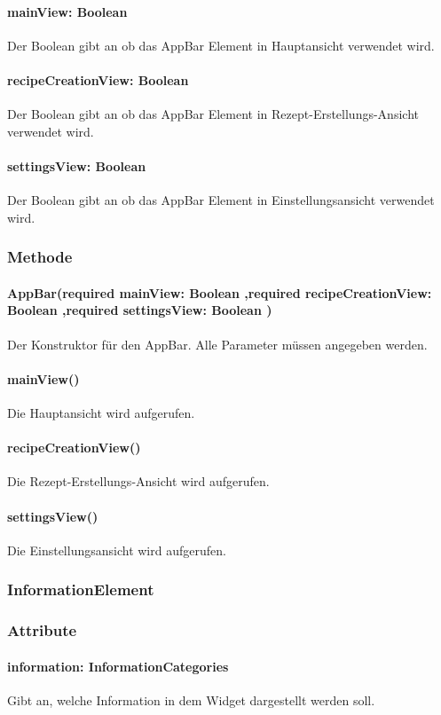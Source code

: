 \documentclass{entwurfsheft}
\begin{document}
\paragraph*{mainView: Boolean} Der Boolean gibt an ob das AppBar Element in Hauptansicht verwendet wird.
\paragraph*{recipeCreationView: Boolean} Der Boolean gibt an ob das AppBar Element in Rezept-Erstellungs-Ansicht verwendet wird.
\paragraph*{settingsView: Boolean} Der Boolean gibt an ob das AppBar Element in Einstellungsansicht verwendet wird.

\subsubsection*{Methode}
\paragraph*{AppBar(required mainView: Boolean ,required recipeCreationView: Boolean ,required settingsView: Boolean )} Der Konstruktor für den AppBar. Alle Parameter müssen angegeben werden.
\paragraph*{mainView()} Die Hauptansicht wird aufgerufen.
\paragraph*{recipeCreationView()} Die Rezept-Erstellungs-Ansicht wird aufgerufen.
\paragraph*{settingsView()} Die Einstellungsansicht wird aufgerufen.


\subsubsection{InformationElement}\label{sec:InformationElement}
\subsubsection*{Attribute}
\paragraph*{information: InformationCategories} Gibt an, welche Information in dem Widget dargestellt werden soll.
\end{document}
